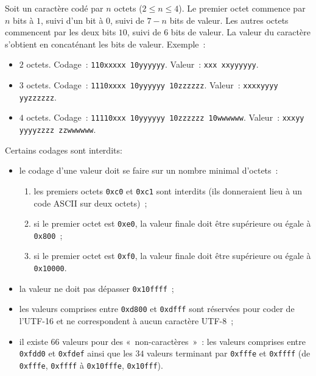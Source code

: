 \documentclass[12pt]{article}
\begin{document}
Soit un caractère codé par $n$ octets ($2 \leq n \leq 4$).
Le premier octet commence par $n$ bits à $1$, suivi d'un bit à $0$, 
suivi de $7-n$ bits de valeur. Les autres octets commencent par les deux
bits $10$, suivi de $6$ bits de valeur.
La valeur du caractère s'obtient en concaténant les bits de valeur.
Exemple~:
\begin{itemize}
\item
$2$ octets. Codage~: {\tt 110xxxxx 10yyyyyy}. Valeur~: {\tt xxx xxyyyyyy}.
\item
$3$ octets. Codage~: {\tt 1110xxxx 10yyyyyy 10zzzzzz}. 
	Valeur~: {\tt xxxxyyyy yyzzzzzz}.
\item
$4$ octets. Codage~: {\tt 11110xxx 10yyyyyy 10zzzzzz 10wwwwww}.
          Valeur~: {\tt xxxyy yyyyzzzz zzwwwwww}.
\end{itemize}
Certains codages sont interdits:
\begin{itemize}
\item
le codage d'une valeur doit se faire sur un nombre minimal d'octets~:
\begin{enumerate}
\item
les premiers octets {\tt 0xc0} et {\tt 0xc1} sont interdits (ils 
	donneraient lieu à un code ASCII sur deux octets)~;
\item
si le premier octet est {\tt 0xe0}, la valeur finale doit être 
supérieure ou égale à {\tt 0x800}~;
\item
si le premier octet est {\tt 0xf0}, la valeur finale doit être 
supérieure ou égale à {\tt 0x10000}.
\end{enumerate}
\item
la valeur ne doit pas dépasser {\tt 0x10ffff}~;
\item
les valeurs comprises entre {\tt 0xd800} et {\tt 0xdfff} sont réservées 
pour coder de l'UTF-16 et ne correspondent à aucun caractère UTF-8~;
\item
il existe $66$ valeurs pour des «~non-caractères~»~: les valeurs
comprises entre {\tt 0xfdd0} et {\tt 0xfdef} ainsi que les $34$
valeurs terminant par {\tt 0xfffe} et {\tt 0xffff} (de 
{\tt 0xfffe}, {\tt 0xffff} à {\tt 0x10fffe}, {\tt 0x10fff}). 
\end{itemize}




\end{document}
